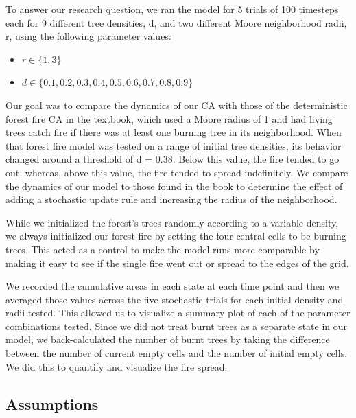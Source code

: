 \documentclass[]{article}
\providecommand{\tightlist}{%
  \setlength{\itemsep}{0pt}\setlength{\parskip}{0pt}}
\begin{document}
To answer our research question, we ran the model for 5 trials of 100
timesteps each for 9 different tree densities, d, and two different
Moore neighborhood radii, r, using the following parameter values:

\begin{itemize}
\tightlist
\item
  \(r \in \{1, 3\}\)
\item
  \(d \in \{0.1, 0.2, 0.3, 0.4, 0.5, 0.6, 0.7, 0.8, 0.9\}\)
\end{itemize}

Our goal was to compare the dynamics of our CA with those of the
deterministic forest fire CA in the textbook, which used a Moore radius
of 1 and had living trees catch fire if there was at least one burning
tree in its neighborhood. When that forest fire model was tested on a
range of initial tree densities, its behavior changed around a threshold
of d = 0.38. Below this value, the fire tended to go out, whereas, above
this value, the fire tended to spread indefinitely. We compare the
dynamics of our model to those found in the book to determine the effect
of adding a stochastic update rule and increasing the radius of the
neighborhood.

While we initialized the forest's trees randomly according to a variable
density, we always initialized our forest fire by setting the four
central cells to be burning trees. This acted as a control to make the
model runs more comparable by making it easy to see if the single fire
went out or spread to the edges of the grid.

We recorded the cumulative areas in each state at each time point and
then we averaged those values across the five stochastic trials for each
initial density and radii tested. This allowed us to visualize a summary
plot of each of the parameter combinations tested. Since we did not
treat burnt trees as a separate state in our model, we back-calculated
the number of burnt trees by taking the difference between the number of
current empty cells and the number of initial empty cells. We did this
to quantify and visualize the fire spread.

\hypertarget{assumptions}{%
\subsection{Assumptions}\label{assumptions}}
\end{document}
